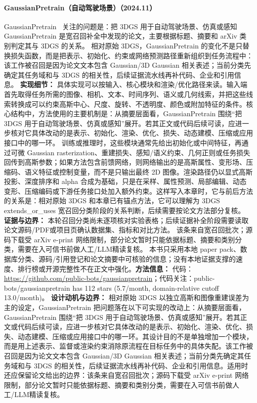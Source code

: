 \paragraph{GaussianPretrain（自动驾驶场景）（2024.11）}
GaussianPretrain~\cite{2411_12452} 关注的问题是：把 3DGS 用于自动驾驶场景、仿真或感知 GaussianPretrain 是宽召回补全中发现的论文，主要根据标题、摘要和 arXiv 类别判定其与 3DGS 的关系。
相对原始 3DGS，GaussianPretrain 的变化不是只替换损失函数，而是把表示、初始化、约束或网络预测路径重新组织到任务流程中：该工作被召回是因为论文文本包含 Gaussian/3D Gaussian 相关表述；当前分类先确定其任务域和与 3DGS 的相关性，后续证据流水线再补代码、企业和引用信息。
\textbf{实现细节：} 具体实现可以按输入、核心模块和渲染/优化路径来读。输入端首先取得任务所需的图像、相机、文本、时间序列、语义或几何线索，并把这些线索转换成可以约束高斯中心、尺度、旋转、不透明度、颜色或附加特征的条件。核心结构中，方法使用的主要机制是：从摘要层面看，GaussianPretrain 围绕“把 3DGS 用于自动驾驶场景、仿真或感知”展开。若其正文或代码后续可读，应进一步核对它具体改动的是表示、初始化、渲染、优化、损失、动态建模、压缩或应用接口中的哪一环。 训练或推理时，这些模块通常先给出初始化或中间特征，再通过可微 Gaussian rasterization、重建损失、感知/语义约束、几何正则或任务损失回传到高斯参数；如果方法包含前馈网络，则网络输出的是高斯属性、变形场、压缩码、语义特征或控制变量，而不是只输出最终 2D 图像。渲染路径仍以显式高斯投影、深度排序和 alpha 合成为基础，只是在采样、属性预测、局部编辑、动态变形、压缩编码或下游任务接口处加入额外约束。这样写入本章时，它与前后方法的关系是：相对原始 3DGS 和本章已有锚点方法，它可以理解为 3DGS extends\_or\_uses 宽召回分类阶段的关系判断，后续需要按论文方法部分复核。
\textbf{证据与边界：} 本轮召回分类尚未逐项核对实验表格；后续证据补全阶段需要读取论文源码/PDF或项目页确认数据集、指标和对比方法。 该条来自宽召回批次；源码下载受 arXiv e-print 网络限制，部分论文暂时只能依据标题、摘要和类别分类，需要在入可信书前做人工/LLM精读复核。 本书只采用本地 paper pack、数据库分类、源码/引用登记和论文摘要中可核验的信息；没有本地证据支撑的速度、排行榜或开源完整性不在正文中强化。\textbf{方法信息：} 代码：\url{https://github.com/public-bots/gaussianpretrain}；代码关注：public-bots/gaussianpretrain has 112 stars (5.7/month, domain-relative cutoff 13.0/month)。
\textbf{设计动机与边界：} 相对原始 3DGS 以独立高斯和图像重建误差为主的设定，GaussianPretrain 把问题落在以下可实现的改动上：从摘要层面看，GaussianPretrain 围绕“把 3DGS 用于自动驾驶场景、仿真或感知”展开。若其正文或代码后续可读，应进一步核对它具体改动的是表示、初始化、渲染、优化、损失、动态建模、压缩或应用接口中的哪一环。其设计目的不是单独增加一个模块，而是用上述表示、监督或渲染约束消除原流程在目标任务中的具体失配。该工作被召回是因为论文文本包含 Gaussian/3D Gaussian 相关表述；当前分类先确定其任务域和与 3DGS 的相关性，后续证据流水线再补代码、企业和引用信息。适用时还应保留论文给出的边界：该条来自宽召回批次；源码下载受 arXiv e-print 网络限制，部分论文暂时只能依据标题、摘要和类别分类，需要在入可信书前做人工/LLM精读复核。
